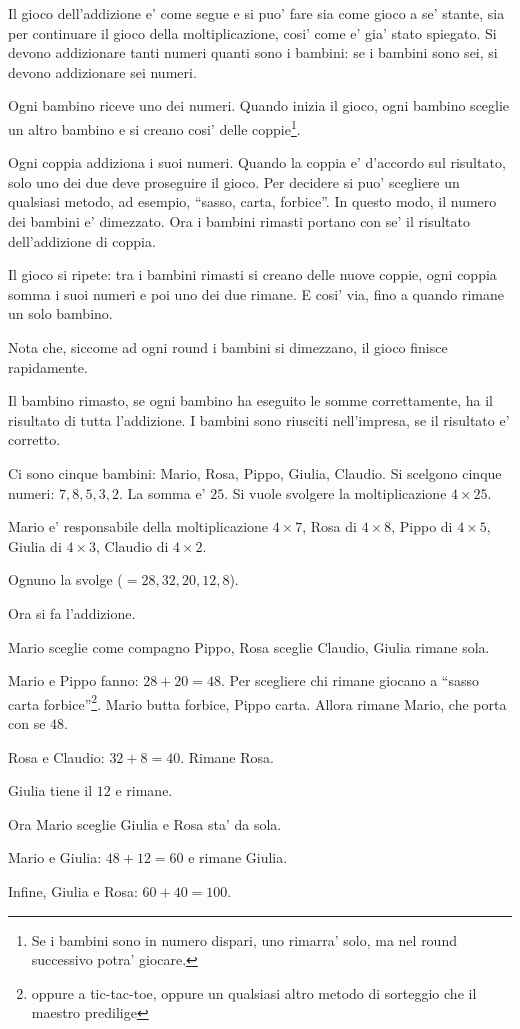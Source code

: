 \documentclass[a4paper]{article}
\begin{document}
Il gioco dell'addizione e' come segue e si puo' fare sia come gioco a se' stante, sia per continuare il gioco della moltiplicazione, cosi' come e' gia' stato spiegato.  Si devono addizionare tanti numeri quanti sono i bambini: se i bambini sono sei, si devono addizionare sei numeri.

Ogni bambino riceve uno dei numeri. Quando inizia il gioco, ogni bambino sceglie un altro bambino e si creano cosi' delle coppie\footnote{Se i bambini sono in numero dispari, uno rimarra' solo, ma nel round successivo potra' giocare.}.

Ogni coppia addiziona i suoi numeri. Quando la coppia e' d'accordo sul risultato, solo uno dei due deve proseguire il gioco. Per decidere si puo' scegliere un qualsiasi metodo, ad esempio, ``sasso, carta, forbice''. In questo modo, il numero dei bambini e' dimezzato. Ora i bambini rimasti portano con se' il risultato dell'addizione di coppia.

Il gioco si ripete: tra i bambini rimasti si creano delle nuove coppie, ogni coppia somma i suoi numeri e poi uno dei due rimane.
E cosi' via, fino a quando rimane un solo bambino.

Nota che, siccome ad ogni round i bambini si dimezzano, il gioco finisce rapidamente.

Il bambino rimasto, se ogni bambino ha eseguito le somme correttamente, ha il risultato di tutta l'addizione. I bambini sono riusciti nell'impresa, se il risultato e' corretto.

\begin{exemp}
Ci sono cinque bambini: Mario, Rosa, Pippo, Giulia, Claudio. Si scelgono cinque numeri: $7,8,5,3,2$. La somma e' $25$. Si vuole svolgere la moltiplicazione $4\times 25$.

Mario e' responsabile della moltiplicazione $4\times 7$, Rosa di $4\times 8$, Pippo di $4\times 5$, Giulia di $4\times 3$, Claudio di $4\times 2$.

Ognuno la svolge ($=28, 32,20,12,8$).

Ora si fa l'addizione.

Mario sceglie come compagno Pippo, Rosa sceglie Claudio, Giulia rimane sola.

Mario e Pippo fanno: $28+20=48$. Per scegliere chi rimane giocano a ``sasso carta forbice''\footnote{oppure a tic-tac-toe, oppure un qualsiasi altro metodo di sorteggio che il maestro predilige}. Mario butta forbice, Pippo carta. Allora rimane Mario, che porta con se $48$.

Rosa e Claudio: $32+8=40$. Rimane Rosa.

Giulia tiene il $12$ e rimane.

Ora Mario sceglie Giulia e Rosa sta' da sola.

Mario e Giulia: $48+12=60$ e rimane Giulia.

Infine, Giulia e Rosa: $60+40=100$.

\end{exemp}
\end{document}
